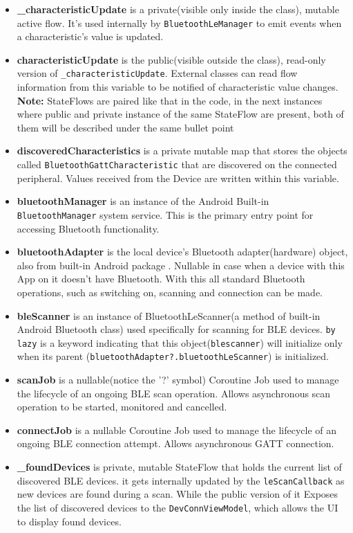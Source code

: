 \begin{itemize}
	\item \textbf{\_characteristicUpdate} is a private(visible only inside the class), mutable active flow. It's used internally by \texttt{BluetoothLeManager} to emit events when a characteristic's value is updated.
	\item \textbf{characteristicUpdate} is the public(visible outside the class), read-only version of \texttt{\_characteristicUpdate}. External classes can read flow information from this variable to be notified of characteristic value changes. \textbf{Note:} StateFlows are paired like that in the code, in the next instances where public and private instance of the same StateFlow are present, both of them will be described under the same bullet point
	\item \textbf{discoveredCharacteristics} is a private mutable map that stores the objects called \texttt{BluetoothGattCharacteristic} that are discovered on the connected peripheral. Values received from the Device are written within this variable.
	\item \textbf{bluetoothManager} is an instance of the Android Built-in \texttt{BluetoothManager} system service\cite{android_bluetooth}. This is the primary entry point for accessing Bluetooth functionality.
	\item \textbf{bluetoothAdapter} is the local device's Bluetooth adapter(hardware) object, also from built-in Android package \cite{android_bluetooth}. Nullable in case when a device with this App on it doesn't have Bluetooth. With this all standard Bluetooth operations, such as switching on, scanning and  connection can be made.
	\item \textbf{bleScanner} is an instance of BluetoothLeScanner(a method of built-in Android Bluetooth class) used specifically for scanning for \ac{BLE} devices. \texttt{by lazy} is a keyword indicating that this object(\texttt{blescanner}) will initialize only when its parent (\texttt{bluetoothAdapter?.bluetoothLeScanner})  is initialized.
	\item \textbf{scanJob} is a nullable(notice the '?' symbol) Coroutine Job used to manage the lifecycle of an ongoing BLE scan operation. Allows asynchronous scan operation to be started, monitored and cancelled.
	\item \textbf{connectJob} is a nullable Coroutine Job used to manage the lifecycle of an ongoing \ac{BLE} connection attempt. Allows asynchronous \ac{GATT} connection.
	\item \textbf{\_foundDevices} is private, mutable StateFlow that holds the current list of discovered \ac{BLE} devices. it gets internally updated by the \texttt{leScanCallback} as new devices are found during a scan. While the public version of it Exposes the list of discovered devices to the \texttt{DevConnViewModel}, which allows the UI to display found devices.

\end{itemize}

